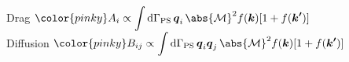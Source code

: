\documentclass[aspectratio=169,11pt,usenames,dvipsnames]{beamer}
\begin{document}
\begin{frame}
\begin{columns}
\begin{column}{0.483\textwidth}
            \end{column}
            \begin{column}{0.066\textwidth}\end{column}
        \end{columns}
        \vspace{-5pt}
        \begin{center}
            \footnotesize
            \hspace{9pt}Drag $\displaystyle {\color{pinky}A_i}\propto \int\mathrm{d}\Gamma_{\mathrm{PS}}\,\boldsymbol{q}_i\,\abs{\mathcal{M}}^2f(\boldsymbol{k})[1+ f(\boldsymbol{k}^{\boldsymbol{\prime}})]$ \\
            Diffusion $\displaystyle {\color{pinky}B_{ij}}\propto \int\mathrm{d}\Gamma_{\mathrm{PS}}\,\boldsymbol{q}_i\boldsymbol{q}_j\,\abs{\mathcal{M}}^2f(\boldsymbol{k})[1+ f(\boldsymbol{k}^{\boldsymbol{\prime}})]$
        \end{center}
\end{frame}


\end{document}
